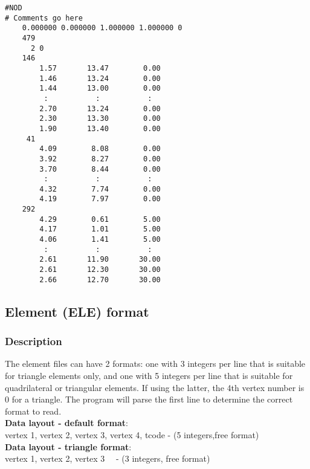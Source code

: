 \documentclass{article}
\begin{document}
\begin{small}
\begin{lstlisting}
#NOD 
# Comments go here
    0.000000 0.000000 1.000000 1.000000 0 
    479
      2 0
    146
        1.57       13.47        0.00
        1.46       13.24        0.00
        1.44       13.00        0.00
         :           :           :
        2.70       13.24        0.00
        2.30       13.30        0.00
        1.90       13.40        0.00
     41
        4.09        8.08        0.00
        3.92        8.27        0.00
        3.70        8.44        0.00
         :           :           :
        4.32        7.74        0.00
        4.19        7.97        0.00
    292
        4.29        0.61        5.00
        4.17        1.01        5.00
        4.06        1.41        5.00
         :           :           :
        2.61       11.90       30.00
        2.61       12.30       30.00
        2.66       12.70       30.00
\end{lstlisting}
\end{small}

\newpage
\subsection[Element (ELE) format]{Element (ELE) format}

\subsubsection[Description]{Description}

The element files can have 2 formats: one with 3 integers per line that is suitable for
triangle elements only, and one with 5 integers per line that is suitable for 
quadrilateral or triangular elements. If using the latter, the 4th vertex number
is 0 for a triangle. The program will parse the first line
to determine the correct format to read.\\

\textbf{Data layout - default format}: \\ 

\noindent
vertex 1, vertex 2, vertex 3, vertex 4, tcode - (5 integers,free format) \\

\textbf{Data layout - triangle format}: \\ 

\noindent
vertex 1, vertex 2, vertex 3 \ \ {}- (3 integers, free format)\newline
\end{document}
